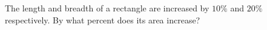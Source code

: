 The length and breadth of a rectangle are increased by $10\%$ and $20\%$ respectively. By what percent does its area increase?

